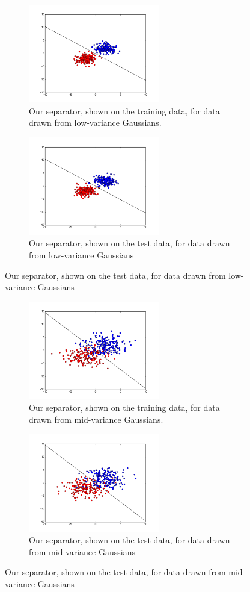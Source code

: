 \documentclass{sigchi}
\begin{document}
{\begin{figure}
\begin{subfigure}[b]{2.25in}
	\includegraphics[width = 2.25in]{plots/stdev1_train_plot.png}
	\caption{Our separator, shown on the training data, for data drawn from low-variance Gaussians.}
\end{subfigure}

\begin{subfigure}[b]{2.25in}
	\includegraphics[width = 2.25in]{plots/stdev1_test_plot.png}
	\caption{Our separator, shown on the test data, for data drawn from low-variance Gaussians}
\end{subfigure}

\end{figure}

\begin{figure}
\centering

\begin{subfigure}[b]{2.25in}
	\includegraphics[width = 2.25in]{plots/stdev2_train_plot.png}
	\caption{Our separator, shown on the training data, for data drawn from mid-variance Gaussians.}
\end{subfigure}

\begin{subfigure}[b]{2.25in}
	\includegraphics[width = 2.25in]{plots/stdev2_test_plot.png}
	\caption{Our separator, shown on the test data, for data drawn from mid-variance Gaussians}
\end{subfigure}


\end{figure}}
\end{document}
